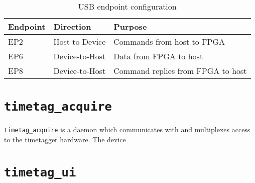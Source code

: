 \begin{table}
  \begin{tabular}{|lll|}
    \hline
    Endpoint & Direction      & Purpose \\
    \hline
    EP2      & Host-to-Device & Commands from host to FPGA \\
    EP6      & Device-to-Host & Data from FPGA to host \\
    EP8      & Device-to-Host & Command replies from FPGA to host \\
    \hline
  \end{tabular}
  \caption{USB endpoint configuration}
  \label{Table:Endpoints}
\end{table}

\section{\tt timetag\_acquire}
{\tt timetag\_acquire} is a daemon which communicates with and multiplexes access to the timetagger hardware. The device 

\section{\tt timetag\_ui}
